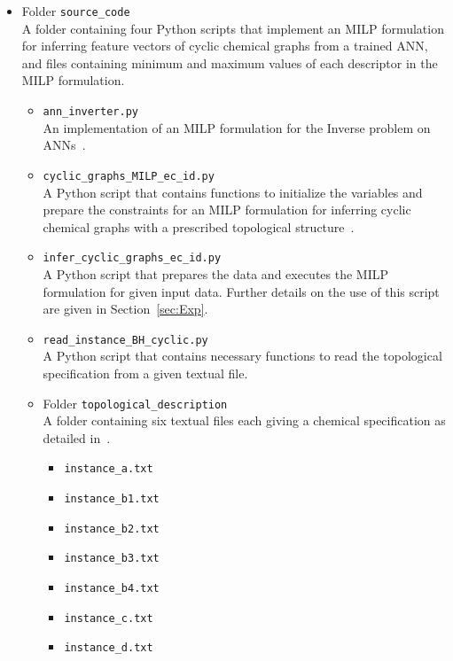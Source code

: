 \documentclass[11pt, titlepage, dvipdfmx, twoside]{article}
\begin{document}
\begin{itemize}

\item Folder {\tt source\_code}\\
A folder containing four Python scripts that implement
an MILP formulation for inferring feature vectors
of cyclic chemical graphs from a trained ANN,
and files containing minimum and maximum values
of each descriptor
in the MILP formulation.

\begin{itemize}

\item {\tt ann\_inverter.py}\\
An implementation of an MILP formulation 
for the Inverse problem on  ANNs~\cite{AN19}.

\item {\tt cyclic\_graphs\_MILP\_ec\_id.py}\\
A Python script that contains functions to initialize the variables and prepare 
the constraints for an MILP
formulation for inferring cyclic chemical graphs with 
a prescribed topological structure~\cite{cyclic_BH_arxiv}.

\item {\tt infer\_cyclic\_graphs\_ec\_id.py}\\
A Python script that prepares the data and executes 
the MILP formulation for given input data.
Further details on the use of this script
are given in Section~\ref{sec:Exp}.

\item {\tt read\_instance\_BH\_cyclic.py}\\
A Python script that contains necessary functions
to read the topological specification from a given textual file.

\item Folder {\tt topological\_description}\\
A folder containing six textual files each giving a chemical specification as detailed 
in~\cite{cyclic_BH_arxiv}.
%
\begin{itemize}
 \item {\tt instance\_a.txt} 
 \item {\tt instance\_b1.txt} 
 \item {\tt instance\_b2.txt} 
 \item {\tt instance\_b3.txt}
 \item {\tt instance\_b4.txt}  
 \item {\tt instance\_c.txt} 
 \item {\tt instance\_d.txt} 
\end{itemize}


\end{itemize}
\end{itemize}
\end{document}
